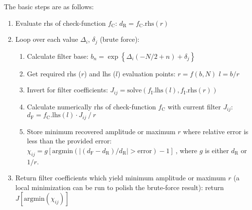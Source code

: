 \documentclass[paper,twocolumn,twoside]{geophysics}
\newcommand{\mr}[1]{\mathrm{#1}}
\begin{document}
The basic steps are as follows:
\begin{enumerate}
  \item Evaluate rhs of check-function $f_\mr{C}$:\newline
        $d_\mr{R} = f_\mr{C}.\mr{rhs}(r)$
  \item Loop over each value $\Delta_i$, $\delta_j$ (brute force):
    \begin{enumerate}
      \item Calculate filter base:\newline
        $b_n = \exp\left\{\Delta_i(-N/2+n) + \delta_j\right\}$
      \item Get required rhs ($r$) and lhs ($l$) evaluation points:\newline
        $r = f(b, N)$\newline
        $l = b/r$
      \item Invert for filter coefficients:\newline
        $J_{ij} = \mr{solve}(f_\mr{I}.\mr{lhs}(l), f_\mr{I}.\mr{rhs}(r))$
    \item Calculate numerically rhs of check-function $f_\mr{C}$ with current
      filter $J_{ij}$:\newline
      $d_\mr{F} = f_\mr{C}.\mr{lhs}(l)\cdot J_{ij}\ /\ r$
      \item Store minimum recovered amplitude or maximum $r$ where relative
        error is less than the provided error:\newline
        $\chi_{ij} = g\left[
        \mr{argmin}\left(|(d_\mr{F}-d_\mr{R})/d_\mr{R}| >
        \mr{error}\right) -1\right]\ $, where $g$ is either $d_\mr{R}$
        or $1/r$.
    \end{enumerate}
  \item Return filter coefficients which yield minimum amplitude or maximum $r$
    (a local minimization can be run to polish the brute-force result):\newline
    return $J\left[\mr{argmin}(\chi_{ij})\right] $\newline
\end{enumerate}
\end{document}
